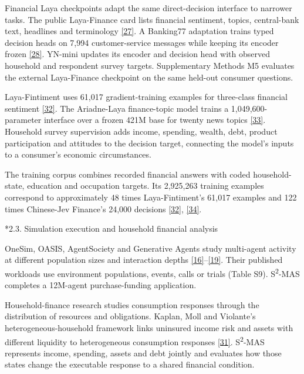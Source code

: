 \documentclass[10pt]{article}
\makeatletter
\renewcommand\subsection{\@startsection{subsection}{2}{\z@}{-1.7ex plus -.5ex minus -.2ex}{.6ex plus .2ex}{\normalfont\normalsize\mdseries}}
\makeatother
\begin{document}
Financial Laya checkpoints adapt the same direct-decision interface to narrower tasks. The public Laya-Finance card lists financial sentiment, topics, central-bank text, headlines and terminology \href{https://huggingface.co/hravi/laya-finance}{[27]}. A Banking77 adaptation trains typed decision heads on 7,994 customer-service messages while keeping its encoder frozen \href{https://huggingface.co/dimitrisdais/laya-banking77-typed-decisions}{[28]}. YN-mini updates its encoder and decision head with observed household and respondent survey targets. Supplementary Methods M5 evaluates the external Laya-Finance checkpoint on the same held-out consumer questions.

Laya-Fintiment uses 61,017 gradient-training examples for three-class financial sentiment \href{https://huggingface.co/shanaka95/laya-fintiment}{[32]}. The Ariadne-Laya finance-topic model trains a 1,049,600-parameter interface over a frozen 421M base for twenty news topics \href{https://huggingface.co/GoatHerder/Ariadne-Laya-FinanceTopics}{[33]}. Household survey supervision adds income, spending, wealth, debt, product participation and attitudes to the decision target, connecting the model's inputs to a consumer's economic circumstances.

The training corpus combines recorded financial answers with coded household-state, education and occupation targets. Its 2,925,263 training examples correspond to approximately 48 times Laya-Fintiment's 61,017 examples and 122 times Chinese-Jev Finance's 24,000 decisions \href{https://huggingface.co/shanaka95/laya-fintiment}{[32]}, \href{https://arxiv.org/abs/2609.36965}{[34]}.

\subsection*{2.3. Simulation execution and household financial analysis}

OneSim, OASIS, AgentSociety and Generative Agents study multi-agent activity at different population sizes and interaction depths \href{https://arxiv.org/abs/2505.07581}{[16]}--\href{https://arxiv.org/abs/2304.03442}{[19]}. Their published workloads use environment populations, events, calls or trials (Table S9). S\textsuperscript{2}-MAS completes a 12M-agent purchase-funding application.

Household-finance research studies consumption responses through the distribution of resources and obligations. Kaplan, Moll and Violante's heterogeneous-household framework links uninsured income risk and assets with different liquidity to heterogeneous consumption responses \href{https://www.aeaweb.org/articles?id=10.1257/aer.20160042}{[31]}. S\textsuperscript{2}-MAS represents income, spending, assets and debt jointly and evaluates how those states change the executable response to a shared financial condition.
\end{document}
